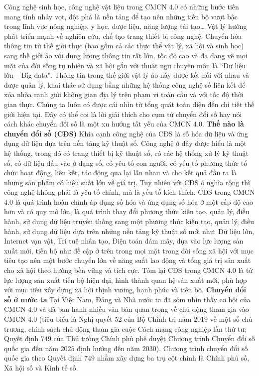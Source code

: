 \begin{multicols}{2}
	\vskip 0.05cm
	Công nghệ sinh học, công nghệ vật liệu trong CMCN $4.0$ có những bước tiến mang tính nhảy vọt, đột phá là nền tảng để tạo nên những tiến bộ vượt bậc trong lĩnh vực nông nghiệp, y học, dược liệu, năng lượng tái tạo… Vật lý hướng phát triển mạnh về nghiên cứu, chế tạo trang thiết bị công nghệ.
	\vskip 0.05cm
	Chuyển hóa thông tin từ thế giới thực (bao gồm cả các thực thể vật lý, xã hội và sinh học) sang thế giới ảo với dung lượng thông tin rất lớn, tốc độ cao và đa dạng về mọi mặt của đời sống tự nhiên và xã hội gắn với thuật ngữ chuyên môn là ``Dữ liệu lớn -- Big data". 
	\vskip 0.05cm
	Thông tin trong thế giới vật lý ảo này được kết nối với nhau và được quản lý, khai thác sử dụng bằng những hệ thống công nghệ số liên kết để xóa nhòa ranh giới không gian địa lý trên phạm vi toàn cầu và với tốc độ thời gian thực. Chúng ta luôn có được cái nhìn từ tổng quát toàn diện đến chi tiết thế giới hiện tại. Đây có thể coi là lời giải thích cho cụm từ chuyển đổi số hay nói cách khác chuyển đổi số là một xu hướng tất yếu của CMCN $4{.}0$.
	\vskip 0.05cm
	\textbf{\color{toanhocdoisong}Thế nào là chuyển đổi số (CĐS)}
	\vskip 0.05cm
	Khía cạnh công nghệ của CĐS là số hóa dữ liệu và ứng dụng dữ liệu dựa trên nền tảng kỹ thuật số. Công nghệ ở đây được hiểu là một hệ thống, trong đó có trang thiết bị kỹ thuật số, có các hệ thống xử lý kỹ thuật số, có dữ liệu đầu vào ở dạng số, có yêu tố con người, có yếu tố phương thức tổ chức hoạt động,  liên kết, tác động qua lại lẫn nhau và cho kết quả đầu ra là những sản phẩm có hiệu suất lớn về giá trị.
	\vskip 0.05cm
	Tuy nhiên với CĐS ở nghĩa rộng thì công nghệ không phải là yêu tố chính, mà là yếu tố kích thích. CĐS trong CMCN $4{.}0$ là quá trình hoàn chỉnh áp dụng số hóa và ứng dụng số hóa ở một cấp độ cao hơn và có quy mô lớn, là quá trình thay đổi phương thức kiến tạo, quản lý, điều hành, sử dụng dữ liệu truyền thống sang một phương thức kiến tạo, quản lý, điều hành, sử dụng dữ liệu dựa trên những nền tảng kỹ thuật số mới như: Dữ liệu lớn, Internet vạn vật, Trí tuệ nhân tạo, Điện toán đám mây, dựa vào lực lượng sản xuất mới, tiến bộ như đề cập ở trên trong mọi mặt trong đời sống xã hội với mục tiêu tạo nên một bước chuyển lớn về năng suất lao động và tổng giá trị sản xuất cho xã hội theo hướng bền vững và tích cực. Tóm lại CĐS trong CMCN $4{.}0$ là từ lực lượng sản xuất tiến bộ hiện đại, hình thành quan hệ sản xuất mới, phù hợp với mục tiêu xây dựng xã hội thịnh vương, hạnh phúc và tiến bộ. 
	\vskip 0.05cm
	\textbf{\color{toanhocdoisong}Chuyển đổi số ở nước ta}
	\vskip 0.05cm
	Tại Việt Nam, Đảng và Nhà nước ta đã sớm nhìn thấy cơ hội của CMCN $4{.}0$ và đã ban hành nhiều văn bản quan trong về chủ động tham gia vào CMCN $4{.}0$ (tiêu biểu là Nghị quyết $52$ của Bộ Chính trị năm $2019$ về một số chủ trương, chính sách chủ động tham gia cuộc Cách mạng công  nghiệp lần thứ tư; Quyết định $749$ của Thủ tướng Chính phủ phê duyệt Chương trình Chuyển đổi số quốc gia đến năm $2025$ định hướng đến năm $2030$). Chương trình chuyển đổi số quốc gia theo Quyết định $749$ nhằm xây dựng ba trụ cột chính là Chính phủ số, Xã hội số và Kinh tế số.

\end{multicols}
